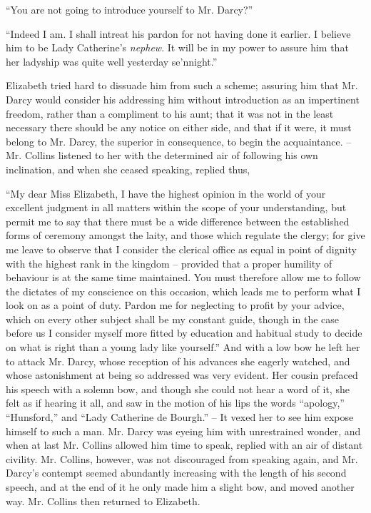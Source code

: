 “You are not going to introduce yourself to Mr.
Darcy?”

“Indeed I am. I shall intreat his pardon for not
having done it earlier. I believe him to be Lady Catherine’s
\textit{nephew}. It will be in my power to assure him that her
ladyship was quite well yesterday se’nnight.”

Elizabeth tried hard to dissuade him from such a
scheme; assuring him that Mr. Darcy would consider his
addressing him without introduction as an impertinent
freedom, rather than a compliment to his aunt; that it
was not in the least necessary there should be any notice
on either side, and that if it were, it must belong to
Mr. Darcy, the superior in consequence, to begin the
acquaintance. -- Mr. Collins listened to her with the determined
air of following his own inclination, and when she
ceased speaking, replied thus,

“My dear Miss Elizabeth, I have the highest opinion
in the world of your excellent judgment in all matters
within the scope of your understanding, but permit me
to say that there must be a wide difference between the
established forms of ceremony amongst the laity, and those
which regulate the clergy; for give me leave to observe
that I consider the clerical office as equal in point of
dignity with the highest rank in the kingdom -- provided
that a proper humility of behaviour is at the same time
maintained. You must therefore allow me to follow the
dictates of my conscience on this occasion, which leads
me to perform what I look on as a point of duty. Pardon
me for neglecting to profit by your advice, which on every
other subject shall be my constant guide, though in the
case before us I consider myself more fitted by education
and habitual study to decide on what is right than a young
lady like yourself.” And with a low bow he left her to
attack Mr. Darcy, whose reception of his advances she
eagerly watched, and whose astonishment at being so
addressed was very evident. Her cousin prefaced his
speech with a solemn bow, and though she could not hear
a word of it, she felt as if hearing it all, and saw in the
motion of his lips the words “apology,” “Hunsford,” and
“Lady Catherine de Bourgh.” -- It vexed her to see him
expose himself to such a man. Mr. Darcy was eyeing him
with unrestrained wonder, and when at last Mr. Collins
allowed him time to speak, replied with an air of distant
civility. Mr. Collins, however, was not discouraged from
speaking again, and Mr. Darcy’s contempt seemed abundantly
increasing with the length of his second speech,
and at the end of it he only made him a slight bow,
and moved another way. Mr. Collins then returned to
Elizabeth.

